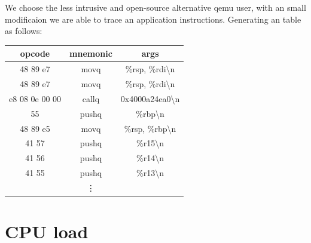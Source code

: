 We choose the less intrusive and open-source alternative qemu user, with an small modificaion we are able to trace an application instructions. Generating an table as follows:


\begin{table}[H]
	\centering
	\begin{tabular}{|c|c|c|}
		\hline
		opcode         & mnemonic & args                          \\ \hline
		48 89 e7       & movq     & \%rsp, \%rdi\textbackslash{}n \\ \hline
		48 89 e7       & movq     & \%rsp, \%rdi\textbackslash{}n \\ \hline
		e8 08 0e 00 00 & callq    & 0x4000a24ea0\textbackslash{}n \\ \hline
		55             & pushq    & \%rbp\textbackslash{}n        \\ \hline
		48 89 e5       & movq     & \%rsp, \%rbp\textbackslash{}n \\ \hline
		41 57          & pushq    & \%r15\textbackslash{}n        \\ \hline
		41 56          & pushq    & \%r14\textbackslash{}n        \\ \hline
		41 55          & pushq    & \%r13\textbackslash{}n        \\ \hline
		& \vdots & \\ \hline
	\end{tabular}
\end{table}


\section{CPU load}

